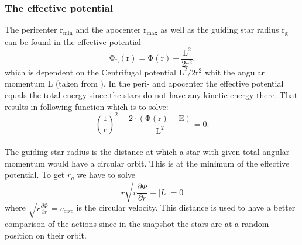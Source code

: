 \subsubsection{The effective potential}
The pericenter \(\mathrm{r_{min}}\) and the apocenter \(\mathrm{r_{max}}\) as well as the guiding star radius \(\mathrm{r_g}\) can be found in the effective potential \begin{equation}
\mathrm{\Phi_L(r)=\Phi(r)+\frac{L^2}{2r^2}}.
\end{equation} which is dependent on the Centrifugal potential \(\mathrm{L^2/2r^2}\) whit the angular momentum L (taken from \citet[p. 59, eq. 6.27]{bartelmann}).  In the peri- and apocenter the effective potential equals the total energy since the stars do not have any kinetic energy there. That results in following function which is to solve: \[\mathrm {\left(\frac{1}{r}\right)^2+\frac{2\cdot (\Phi(r)-E)}{L^2}=0.}\] \\ The guiding star radius is the distance at which a star with given total angular momentum would have a circular orbit. This is at the minimum of the effective potential. To get \(r_g\) we have to solve \[r\sqrt{r\frac{\partial\Phi}{\partial r}}-|L|=0\] where \(\sqrt{r\frac{\partial\Phi}{\partial r}}=v_{circ}\) is the circular velocity. This distance is used to have a better comparison of the actions since in the snapshot the stars are at a random position on their orbit.
